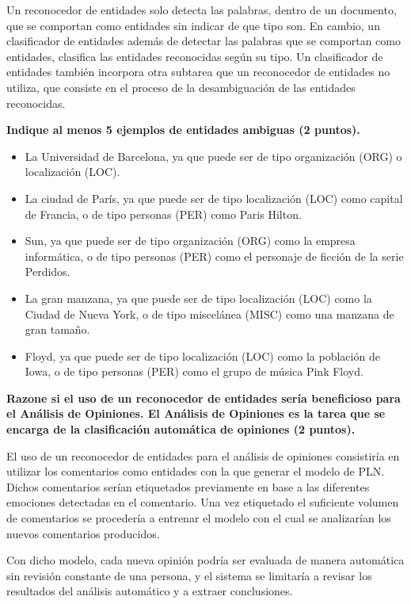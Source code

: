\documentclass[11pt]{exam}
\begin{document}
\begin{questions}
Un reconocedor de entidades solo detecta las palabras, dentro de un documento, que se comportan como entidades sin indicar de que tipo son. En cambio, un clasificador de entidades además de detectar las palabras que se comportan como entidades, clasifica las entidades reconocidas según su tipo. Un clasificador de entidades también incorpora otra subtarea que un reconocedor de entidades no utiliza, que consiste en el proceso de la desambiguación de las entidades reconocidas.

{\bf \question Indique al menos 5 ejemplos de entidades ambiguas (2 puntos).}

\begin{itemize}
	\item La Universidad de Barcelona, ya que puede ser de tipo organización (ORG) o localización (LOC).
	\item La ciudad de París, ya que puede ser de tipo localización (LOC) como capital de Francia, o de tipo personas (PER) como Paris Hilton.
	\item Sun, ya que puede ser de tipo organización (ORG) como la empresa informática, o de tipo personas (PER) como el personaje de ficción de la serie Perdidos.
	\item La gran manzana, ya que puede ser de tipo localización (LOC) como la Ciudad de Nueva York, o de tipo miscelánea (MISC) como una manzana de gran tamaño.
	\item Floyd, ya que puede ser de tipo localización (LOC) como la población de Iowa, o de tipo personas (PER) como el grupo de música Pink Floyd.
\end{itemize}

{\bf \question Razone si el uso de un reconocedor de entidades sería beneficioso para el Análisis de Opiniones. El Análisis de Opiniones es la tarea que se encarga de la clasificación automática de opiniones (2 puntos).}

El uso de un reconocedor de entidades para el análisis de opiniones consistiría en utilizar los comentarios como entidades con la que generar el modelo de PLN. Dichos comentarios serían etiquetados previamente en base a las diferentes emociones detectadas en el comentario. Una vez etiquetado el suficiente volumen de comentarios se procedería a entrenar el modelo con el cual se analizarían los nuevos comentarios producidos.

Con dicho modelo, cada nueva opinión podría ser evaluada de manera automática sin revisión constante de una persona, y el sistema se limitaría a revisar los resultados del análisis automático y a extraer conclusiones.


\end{questions}
\end{document}
